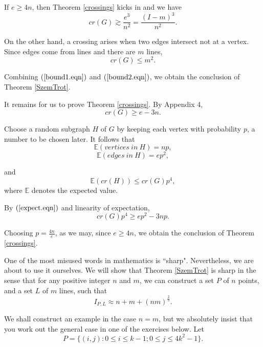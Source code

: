 \documentclass[]{amsart}
\numberwithin{equation}{section}
\theoremstyle{plain}
\theoremstyle{definition}
\theoremstyle{remark}
\begin{document}
If $e \ge 4n$, then Theorem \ref{crossings} kicks in and we have
\begin{equation} \label{bound2.eqn}
cr(G) \gtrsim \frac{e^3}{n^2}=\frac{{(I-m)}^3}{n^2}.
\end{equation}



On the other hand, a crossing arises when two edges intersect not at
a vertex. Since edges come from lines and there are $m$ lines,
\begin{equation}
 cr(G) \leq m^2.
\end{equation}

Combining $(\ref{bound1.eqn})$ and $(\ref{bound2.eqn})$, we obtain
the conclusion of Theorem \ref{SzemTrot}.

It remains for us to prove Theorem \ref{crossings}. By Appendix 4,
\begin{equation}
 cr(G) \ge e-3n.
\end{equation}



Choose a random subgraph $H$ of $G$ by keeping each vertex with probability
$p$, a number to be chosen later. It follows that
\[ \mathbb{E}(vertices \ in \ H)=np, \]
\[\mathbb{E}(edges \ in \ H)=ep^2, \]

and
\begin{equation} \label{expect.eqn}
\mathbb{E}(cr(H)) \leq cr(G)p^4,
\end{equation}
where $\mathbb{E}$ denotes the expected value.

By $(\ref{expect.eqn})$ and linearity of expectation,
\begin{equation}
cr(G)p^4 \ge ep^2-3np.
\end{equation}



Choosing $p=\frac{4n}{e}$, as we may, since $e \ge 4n$, we
obtain the conclusion of Theorem \ref{crossings}.

One of the most misused words in mathematics is ``sharp". Nevertheless,
we are about to use it ourselves. We will show that Theorem \ref{SzemTrot} is sharp
in the sense that for any positive integer $n$ and $m$, we can construct
a set $P$ of $n$ points, and a set $L$ of $m$ lines, such that
\begin{equation} \label{SzemTrot.eqn}
I_{P,L} \approx n+m+{(nm)}^{\frac{2}{3}}.
\end{equation}



We shall construct an example in the case $n=m$, but we absolutely
insist that you work out the general case in one of the exercises below. Let
\begin{equation}
P=\{(i,j): 0 \leq i \leq k-1; 0 \leq j \leq 4k^2-1\}.
\end{equation}
\end{document}
